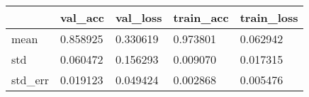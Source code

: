 \begin{tabular}{|l|l|l|l|l|}
\toprule \hline
 & val\_acc & val\_loss & train\_acc & train\_loss \\ \hline
\midrule
mean & 0.858925 & 0.330619 & 0.973801 & 0.062942 \\ \hline
std & 0.060472 & 0.156293 & 0.009070 & 0.017315 \\ \hline
std\_err & 0.019123 & 0.049424 & 0.002868 & 0.005476 \\ \hline
\bottomrule
\end{tabular}
